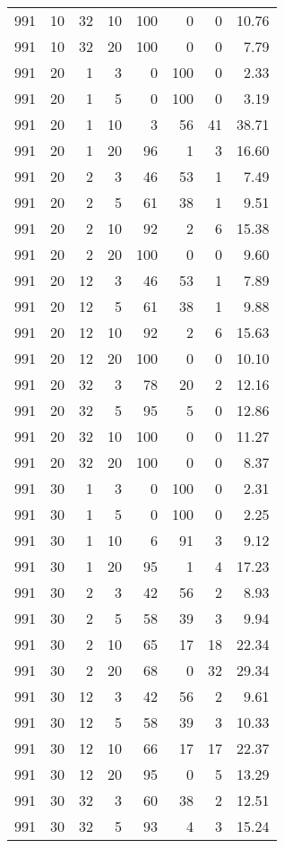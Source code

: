 \begin{tabular}{rrrrrrrr}
991 & 10 & 32 & 10 & 100 & 0 & 0 & 10.76 \\
991 & 10 & 32 & 20 & 100 & 0 & 0 & 7.79 \\
991 & 20 & 1 & 3 & 0 & 100 & 0 & 2.33 \\
991 & 20 & 1 & 5 & 0 & 100 & 0 & 3.19 \\
991 & 20 & 1 & 10 & 3 & 56 & 41 & 38.71 \\
991 & 20 & 1 & 20 & 96 & 1 & 3 & 16.60 \\
991 & 20 & 2 & 3 & 46 & 53 & 1 & 7.49 \\
991 & 20 & 2 & 5 & 61 & 38 & 1 & 9.51 \\
991 & 20 & 2 & 10 & 92 & 2 & 6 & 15.38 \\
991 & 20 & 2 & 20 & 100 & 0 & 0 & 9.60 \\
991 & 20 & 12 & 3 & 46 & 53 & 1 & 7.89 \\
991 & 20 & 12 & 5 & 61 & 38 & 1 & 9.88 \\
991 & 20 & 12 & 10 & 92 & 2 & 6 & 15.63 \\
991 & 20 & 12 & 20 & 100 & 0 & 0 & 10.10 \\
991 & 20 & 32 & 3 & 78 & 20 & 2 & 12.16 \\
991 & 20 & 32 & 5 & 95 & 5 & 0 & 12.86 \\
991 & 20 & 32 & 10 & 100 & 0 & 0 & 11.27 \\
991 & 20 & 32 & 20 & 100 & 0 & 0 & 8.37 \\
991 & 30 & 1 & 3 & 0 & 100 & 0 & 2.31 \\
991 & 30 & 1 & 5 & 0 & 100 & 0 & 2.25 \\
991 & 30 & 1 & 10 & 6 & 91 & 3 & 9.12 \\
991 & 30 & 1 & 20 & 95 & 1 & 4 & 17.23 \\
991 & 30 & 2 & 3 & 42 & 56 & 2 & 8.93 \\
991 & 30 & 2 & 5 & 58 & 39 & 3 & 9.94 \\
991 & 30 & 2 & 10 & 65 & 17 & 18 & 22.34 \\
991 & 30 & 2 & 20 & 68 & 0 & 32 & 29.34 \\
991 & 30 & 12 & 3 & 42 & 56 & 2 & 9.61 \\
991 & 30 & 12 & 5 & 58 & 39 & 3 & 10.33 \\
991 & 30 & 12 & 10 & 66 & 17 & 17 & 22.37 \\
991 & 30 & 12 & 20 & 95 & 0 & 5 & 13.29 \\
991 & 30 & 32 & 3 & 60 & 38 & 2 & 12.51 \\
991 & 30 & 32 & 5 & 93 & 4 & 3 & 15.24 \\

\end{tabular}
